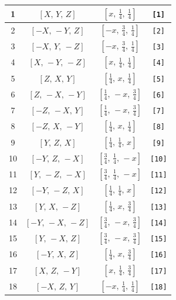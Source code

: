 \documentclass[fleqn,8pt]{jsarticle}
\begin{document}
\begin{longtable}{cccc}
1 & $\left[ X,\, Y,\, Z \right]$ & $\left[ x,\, \frac{1}{4},\, \frac{1}{4} \right]$ & {\tt [1]} \\ \hline
2 & $\left[ - X,\, - Y,\, Z \right]$ & $\left[ - x,\, \frac{3}{4},\, \frac{1}{4} \right]$ & {\tt [2]} \\ \hline
3 & $\left[ - X,\, Y,\, - Z \right]$ & $\left[ - x,\, \frac{3}{4},\, \frac{1}{4} \right]$ & {\tt [3]} \\ \hline
4 & $\left[ X,\, - Y,\, - Z \right]$ & $\left[ x,\, \frac{1}{4},\, \frac{1}{4} \right]$ & {\tt [4]} \\ \hline
5 & $\left[ Z,\, X,\, Y \right]$ & $\left[ \frac{1}{4},\, x,\, \frac{1}{4} \right]$ & {\tt [5]} \\ \hline
6 & $\left[ Z,\, - X,\, - Y \right]$ & $\left[ \frac{1}{4},\, - x,\, \frac{3}{4} \right]$ & {\tt [6]} \\ \hline
7 & $\left[ - Z,\, - X,\, Y \right]$ & $\left[ \frac{1}{4},\, - x,\, \frac{3}{4} \right]$ & {\tt [7]} \\ \hline
8 & $\left[ - Z,\, X,\, - Y \right]$ & $\left[ \frac{1}{4},\, x,\, \frac{1}{4} \right]$ & {\tt [8]} \\ \hline
9 & $\left[ Y,\, Z,\, X \right]$ & $\left[ \frac{1}{4},\, \frac{1}{4},\, x \right]$ & {\tt [9]} \\ \hline
10 & $\left[ - Y,\, Z,\, - X \right]$ & $\left[ \frac{3}{4},\, \frac{1}{4},\, - x \right]$ & {\tt [10]} \\ \hline
11 & $\left[ Y,\, - Z,\, - X \right]$ & $\left[ \frac{3}{4},\, \frac{1}{4},\, - x \right]$ & {\tt [11]} \\ \hline
12 & $\left[ - Y,\, - Z,\, X \right]$ & $\left[ \frac{1}{4},\, \frac{1}{4},\, x \right]$ & {\tt [12]} \\ \hline
13 & $\left[ Y,\, X,\, - Z \right]$ & $\left[ \frac{1}{4},\, x,\, \frac{3}{4} \right]$ & {\tt [13]} \\ \hline
14 & $\left[ - Y,\, - X,\, - Z \right]$ & $\left[ \frac{3}{4},\, - x,\, \frac{3}{4} \right]$ & {\tt [14]} \\ \hline
15 & $\left[ Y,\, - X,\, Z \right]$ & $\left[ \frac{3}{4},\, - x,\, \frac{3}{4} \right]$ & {\tt [15]} \\ \hline
16 & $\left[ - Y,\, X,\, Z \right]$ & $\left[ \frac{1}{4},\, x,\, \frac{3}{4} \right]$ & {\tt [16]} \\ \hline
17 & $\left[ X,\, Z,\, - Y \right]$ & $\left[ x,\, \frac{1}{4},\, \frac{3}{4} \right]$ & {\tt [17]} \\ \hline
18 & $\left[ - X,\, Z,\, Y \right]$ & $\left[ - x,\, \frac{1}{4},\, \frac{1}{4} \right]$ & {\tt [18]} \\ \hline

\end{longtable}
\end{document}
